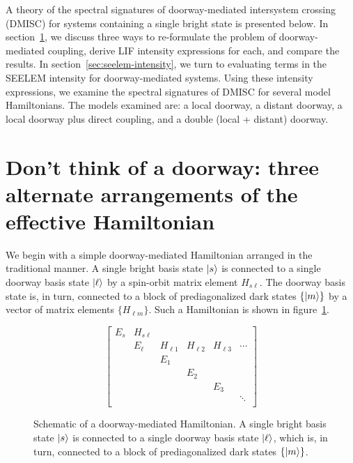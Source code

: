 \documentclass[12pt]{mitthesis}
\begin{document}
A theory of the spectral signatures of doorway-mediated intersystem
crossing (DMISC) for systems containing a single bright state is
presented below. In section~\ref{sec:arrangements}, we discuss three
ways to re-formulate the problem of doorway-mediated coupling, derive
LIF intensity expressions for each, and compare the results.  In
section~\ref{sec:seelem-intensity}, we turn to evaluating terms in the
SEELEM intensity for doorway-mediated systems.  Using these intensity
expressions, we examine the spectral signatures of DMISC for several
model Hamiltonians.  The models examined are: a local doorway, a
distant doorway, a local doorway plus direct coupling, and a double
(local + distant) doorway.


\section{Don't think of a doorway: three alternate arrangements of
  the effective Hamiltonian}
\label{sec:arrangements}

We begin with a simple doorway-mediated Hamiltonian arranged in the
traditional manner. A single bright basis state $\mathinner{|{s}\rangle}$ is connected
to a single doorway basis state $\mathinner{|{\ell}\rangle}$ by a spin-orbit matrix
element $H_{s \ell}$. The doorway basis state is, in turn, connected
to a block of prediagonalized dark states $\lbrace \mathinner{|{m}\rangle} \rbrace$ by
a vector of matrix elements $\lbrace H_{\ell m} \rbrace$. Such a
Hamiltonian is shown in figure~\ref{fig:matrix-doorway}.

\begin{figure}
  \caption{Schematic of a doorway-mediated Hamiltonian. A single
    bright basis state $\mathinner{|{s}\rangle}$ is connected to a single doorway
    basis state $\mathinner{|{\ell}\rangle}$, which is, in turn, connected to a block
    of prediagonalized dark states $\lbrace \mathinner{|{m}\rangle} \rbrace$.}
  \label{fig:matrix-doorway}
  \begin{equation*}
    \begin{bmatrix}
    E_s & H_{s \ell} \\
    & E_\ell & H_{\ell 1} & H_{\ell 2} & H_{\ell 3} & \dotsm \\
    & & E_1 \\
    & & & E_2 \\
    & & & & E_3 \\
    & & & & & \ddots \\
    \end{bmatrix}
  \end{equation*}
\end{figure}
\end{document}
